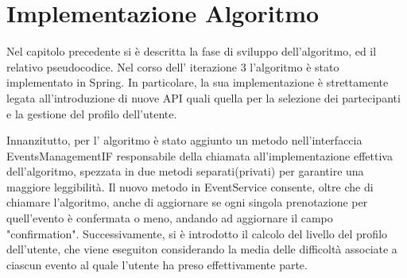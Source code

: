 \section{Implementazione Algoritmo}

Nel capitolo precedente si è descritta la fase di sviluppo dell'algoritmo, ed il relativo pseudocodice.
Nel corso dell' iterazione 3 l'algoritmo è stato implementato in Spring. In particolare, la sua implementazione è strettamente legata
all'introduzione di nuove API quali quella per la selezione dei partecipanti e la gestione del profilo dell'utente.

Innanzitutto, per l' algoritmo è stato aggiunto un metodo nell'interfaccia EventsManagementIF responsabile della chiamata all'implementazione
effettiva dell'algoritmo, spezzata in due metodi separati(privati) per garantire una maggiore leggibilità. Il nuovo metodo
in EventService consente, oltre che di chiamare l'algoritmo, anche di aggiornare se ogni singola prenotazione per quell'evento 
è confermata o meno, andando ad aggiornare il campo "confirmation".
Successivamente, si è introdotto il calcolo del livello del profilo dell'utente, che viene eseguiton considerando la media delle difficoltà
associate a ciascun evento al quale l'utente ha preso effettivamente parte.

